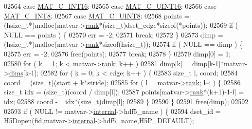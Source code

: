 \begin{DoxyCode}
{{{{{{{{{{02564         \textcolor{keywordflow}{case} \hyperlink{group___m_a_t_ggad4d60ae7b709fc81bfd744fb4c857c40a40370e9de516c5036a67a5865c071006}{MAT\_C\_INT16}:
02565         \textcolor{keywordflow}{case} \hyperlink{group___m_a_t_ggad4d60ae7b709fc81bfd744fb4c857c40a8bede21dbf6c1edc0bbccc1481bccae7}{MAT\_C\_UINT16}:
02566         \textcolor{keywordflow}{case} \hyperlink{group___m_a_t_ggad4d60ae7b709fc81bfd744fb4c857c40a984ff310f9e906100fcff95f704f43c5}{MAT\_C\_INT8}:
02567         \textcolor{keywordflow}{case} \hyperlink{group___m_a_t_ggad4d60ae7b709fc81bfd744fb4c857c40a81270f8093cb4808e992c1d29d84d4e3}{MAT\_C\_UINT8}:
02568             points = (hsize\_t*)malloc(matvar->\hyperlink{group___m_a_t_a84ba70c96ded13cc555fa75b768d9921}{rank}*(\textcolor{keywordtype}{size\_t})dset\_edge*\textcolor{keyword}{sizeof}(*points));
02569             \textcolor{keywordflow}{if} ( NULL == points ) \{
02570                 err = -2;
02571                 \textcolor{keywordflow}{break};
02572             \}
02573             dimp = (hsize\_t*)malloc(matvar->\hyperlink{group___m_a_t_a84ba70c96ded13cc555fa75b768d9921}{rank}*\textcolor{keyword}{sizeof}(hsize\_t));
02574             \textcolor{keywordflow}{if} ( NULL == dimp ) \{
02575                 err = -2;
02576                 free(points);
02577                 \textcolor{keywordflow}{break};
02578             \}
02579             dimp[0] = 1;
02580             \textcolor{keywordflow}{for} ( k = 1; k < matvar->\hyperlink{group___m_a_t_a84ba70c96ded13cc555fa75b768d9921}{rank}; k++ )
02581                 dimp[k] = dimp[k-1]*matvar->\hyperlink{group___m_a_t_a8e01234e1c862ce3472bb37f5a09b92c}{dims}[k-1];
02582             for ( k = 0; k < edge; k++ ) \{
02583                 \textcolor{keywordtype}{size\_t} l, coord;
02584                 coord = (size\_t)(start + k*stride);
02585                 \textcolor{keywordflow}{for} ( l = matvar->\hyperlink{group___m_a_t_a84ba70c96ded13cc555fa75b768d9921}{rank}; l--; ) \{
02586                     \textcolor{keywordtype}{size\_t} idx = (size\_t)(coord / dimp[l]);
02587                     points[matvar->\hyperlink{group___m_a_t_a84ba70c96ded13cc555fa75b768d9921}{rank}*(k+1)-1-l] = idx;
02588                     coord -= idx*(size\_t)dimp[l];
02589                 \}
02590             \}
02591             free(dimp);
02592 
02593             \textcolor{keywordflow}{if} ( NULL != matvar->\hyperlink{group___m_a_t_a6e97e3ed9f40c49322c18561c2a94e92}{internal}->hdf5\_name ) \{
02594                 dset\_id = H5Dopen(fid,matvar->\hyperlink{group___m_a_t_a6e97e3ed9f40c49322c18561c2a94e92}{internal}->hdf5\_name,H5P\_DEFAULT);
}}}}}}}}}}
\end{DoxyCode}
